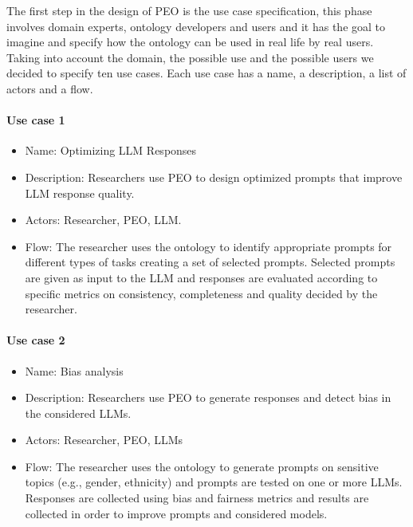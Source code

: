 The first step in the design of PEO is the use case specification, this phase involves domain experts, ontology developers and users and it has the goal to imagine and specify how the ontology can be used in real life by real users.
Taking into account the domain, the possible use and the possible users we decided to specify ten use cases.
Each use case has a name, a description, a list of actors and a flow.
\paragraph{Use case 1}
\begin{itemize}
    \item Name: Optimizing LLM Responses
    \item Description: Researchers use PEO to design optimized prompts that improve LLM response quality.
    \item Actors: Researcher, PEO, LLM.
    \item Flow: The researcher uses the ontology to identify appropriate prompts for different types of tasks creating a set of selected prompts. Selected prompts are given as input to the LLM and responses are evaluated according to specific metrics on consistency, completeness and quality decided by the researcher.
\end{itemize}
\paragraph{Use case 2}
\begin{itemize}
    \item Name: Bias analysis
    \item Description: Researchers use PEO to generate responses and detect bias in the considered LLMs.
    \item Actors: Researcher, PEO, LLMs
    \item Flow: The researcher uses the ontology to generate prompts on sensitive topics (e.g., gender, ethnicity) and prompts are tested on one or more LLMs. Responses are collected using bias and fairness metrics and results are collected in order to improve prompts and considered models. 
\end{itemize}

